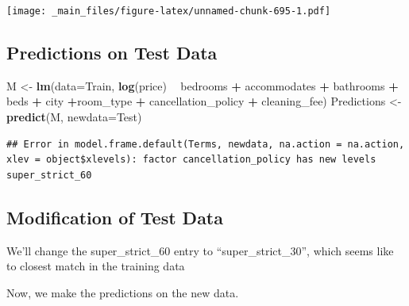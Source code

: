 \documentclass[]{book}
\newenvironment{Shaded}{\begin{snugshade}}{\end{snugshade}}
\newcommand{\KeywordTok}[1]{\textcolor[rgb]{0.13,0.29,0.53}{\textbf{#1}}}
\newcommand{\DataTypeTok}[1]{\textcolor[rgb]{0.13,0.29,0.53}{#1}}
\newcommand{\StringTok}[1]{\textcolor[rgb]{0.31,0.60,0.02}{#1}}
\newcommand{\OperatorTok}[1]{\textcolor[rgb]{0.81,0.36,0.00}{\textbf{#1}}}
\newcommand{\NormalTok}[1]{#1}
\begin{document}
\texttt{[image: \_main\_files/figure-latex/unnamed-chunk-695-1.pdf]}

\subsection{Predictions on Test Data}\label{predictions-on-test-data}

\begin{Shaded}
\begin{Highlighting}[]
\NormalTok{M <-}\StringTok{ }\KeywordTok{lm}\NormalTok{(}\DataTypeTok{data=}\NormalTok{Train, }\KeywordTok{log}\NormalTok{(price) }\OperatorTok{~}\StringTok{ }\NormalTok{bedrooms }\OperatorTok{+}\StringTok{ }\NormalTok{accommodates }\OperatorTok{+}\StringTok{ }\NormalTok{bathrooms }\OperatorTok{+}\StringTok{ }\NormalTok{beds }\OperatorTok{+}\StringTok{ }
\StringTok{           }\NormalTok{city }\OperatorTok{+}\NormalTok{room_type }\OperatorTok{+}\StringTok{ }\NormalTok{cancellation_policy }\OperatorTok{+}\StringTok{ }\NormalTok{cleaning_fee)}
\NormalTok{Predictions <-}\StringTok{ }\KeywordTok{predict}\NormalTok{(M, }\DataTypeTok{newdata=}\NormalTok{Test)}
\end{Highlighting}
\end{Shaded}

\begin{verbatim}
## Error in model.frame.default(Terms, newdata, na.action = na.action, xlev = object$xlevels): factor cancellation_policy has new levels super_strict_60
\end{verbatim}

\subsection{Modification of Test Data}\label{modification-of-test-data}

We'll change the super\_strict\_60 entry to ``super\_strict\_30'', which
seems like to closest match in the training data

\begin{Shaded}
\end{Shaded}

Now, we make the predictions on the new data.
\end{document}
